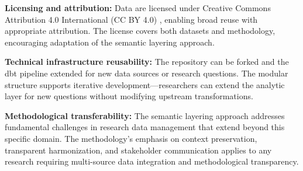 \textbf{Licensing and attribution:} Data are licensed under Creative Commons Attribution 4.0 International (CC BY 4.0) \cite{creative_commons}, enabling broad reuse with appropriate attribution. The license covers both datasets and methodology, encouraging adaptation of the semantic layering approach.

\textbf{Technical infrastructure reusability:} The repository can be forked and the dbt pipeline extended for new data sources or research questions. The modular structure supports iterative development—researchers can extend the analytic layer for new questions without modifying upstream transformations.

\textbf{Methodological transferability:} The semantic layering approach addresses fundamental challenges in research data management that extend beyond this specific domain. The methodology's emphasis on context preservation, transparent harmonization, and stakeholder communication applies to any research requiring multi-source data integration and methodological transparency.